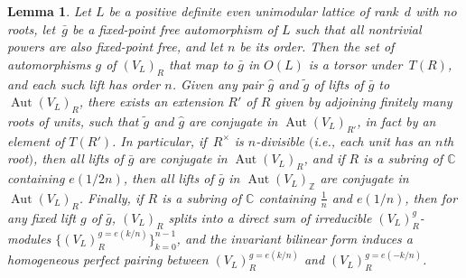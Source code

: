 \documentclass[11pt]{article}
\newcommand{\bC}{\mathbb{C}}
\newcommand{\bZ}{\mathbb{Z}}
\DeclareMathOperator{\Aut}{Aut}
\newtheorem{lem}[thm]{Lemma}
\theoremstyle{definition}
\begin{document}
\begin{lem} \label{lem:fixed-point-free-automorphisms}Let $L$ be a positive definite even unimodular lattice of rank~$d$ with no roots, let~$\bar{g}$ be a fixed-point free automorphism of $L$ such that all nontrivial powers are also fixed-point free, and let $n$ be its order. Then the set of automorphisms $g$ of $(V_L)_R$ that map to $\bar{g}$ in $O(L)$ is a torsor under~$T(R)$, and each such lift has order $n$. Given any pair $\hat{g}$ and $\tilde{g}$ of lifts of $\bar{g}$ to $\Aut (V_L)_R$, there exists an extension $R'$ of $R$ given by adjoining finitely many roots of units, such that $\tilde{g}$ and $\hat{g}$ are conjugate in $\Aut (V_L)_{R'}$, in fact by an element of $T(R')$. In particular, if~$R^\times$ is $n$-divisible $($i.e., each unit has an $n$th root$)$, then all lifts of $\bar{g}$ are conjugate in $\Aut (V_L)_R$, and if $R$ is a subring of $\bC$ containing $e(1/2n)$, then all lifts of $\bar{g}$ in $\Aut (V_L)_\bZ$ are conjugate in $\Aut (V_L)_R$. Finally, if $R$ is a subring of $\bC$ containing $\frac{1}{n}$ and $e(1/n)$, then for any fixed lift $g$ of $\bar{g}$, $(V_L)_R$ splits into a direct sum of irreducible $(V_L)_R^g$-modules $\big\{ (V_L)_R^{g = e(k/n)} \big\}_{k=0}^{n-1}$, and the invariant bilinear form induces a homogeneous perfect pairing between $(V_L)_R^{g = e(k/n)}$ and $(V_L)_R^{g = e(-k/n)}$.
\end{lem}
\end{document}
